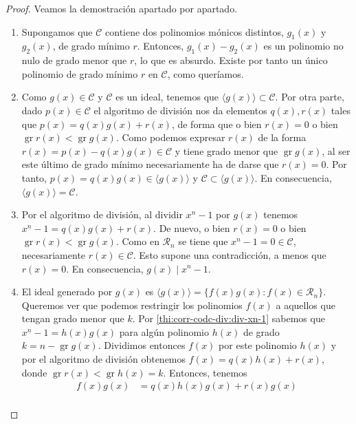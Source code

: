 \begin{proof}
  Veamos la demostración apartado por apartado.
  \begin{enumerate}
    \item Supongamos que \(\mathcal C\) contiene dos polinomios mónicos distintos, \(g_1(x)\) y \(g_2(x)\), de grado mínimo \(r\). 
    Entonces, \(g_1(x) - g_2(x)\) es un polinomio no nulo de grado menor que \(r\), lo que es absurdo. 
    Existe por tanto un único polinomio de grado mínimo \(r\) en \(\mathcal C\), como queríamos.
    \item Como \(g(x) \in \mathcal C\) y \(\mathcal C\) es un ideal, tenemos que \(\langle g(x)\rangle \subset \mathcal C\). 
    Por otra parte, dado \(p(x) \in \mathcal C\) el algoritmo de división nos da elementos \(q(x), r(x)\) tales que \(p(x) = q(x)g(x) + r(x)\), de forma que o bien \(r(x) = 0\) o bien \(\operatorname{gr} r(x) < \operatorname{gr} g(x)\). 
    Como podemos expresar \(r(x)\) de la forma \(r(x) = p(x) - q(x)g(x) \in \mathcal C\) y tiene grado menor que \(\operatorname{gr} g(x)\), al ser este último de grado mínimo necesariamente ha de darse que \(r(x) = 0\).
    Por tanto, \(p(x) = q(x)g(x) \in \langle g(x) \rangle\) y \(\mathcal C \subset \langle g(x) \rangle\).
    En consecuencia, \(\langle g(x) \rangle = \mathcal C\).
    \item Por el algoritmo de división, al dividir \(x^n - 1\) por \(g(x)\) tenemos \(x^n - 1 = q(x)g(x) + r(x)\). De nuevo, o bien \(r(x) = 0\) o bien \(\operatorname{gr} r(x) < \operatorname{gr} g(x)\).
    Como en \(\mathcal R_n\) se tiene que \(x^n - 1 = 0 \in \mathcal C\), necesariamente \(r(x) \in \mathcal C\).
    Esto supone una contradicción, a menos que \(r(x) = 0\).
    En consecuencia, \(g(x) \mid x^n - 1\).
    \item El ideal generado por \(g(x)\) es \(\langle g(x) \rangle = \{f(x)g(x) : f(x) \in \mathcal R_n\}\).
    Queremos ver que podemos restringir los polinomios \(f(x)\) a aquellos que tengan grado menor que \(k\).
    Por \ref{thi:corr-codc-div:div-xn-1} sabemos que \(x^n-1 = h(x)g(x)\) para algún polinomio \(h(x)\) de grado \(k = n - \operatorname{gr} g(x)\).
    Dividimos entonces \(f(x)\) por este polinomio \(h(x)\) y por el algoritmo de división obtenemos \(f(x) = q(x)h(x) + r(x)\), donde \(\operatorname{gr} r(x) < \operatorname{gr} h(x) = k\).
    Entonces, tenemos \begin{align*}
      f(x)g(x) &= q(x)h(x)g(x) + r(x)g(x)\\

\end{align*}
\end{enumerate}
\end{proof}
